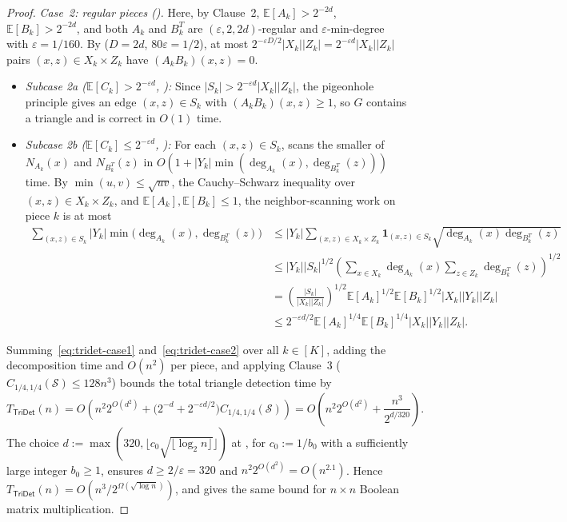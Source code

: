 \documentclass[11pt]{article}
\theoremstyle{definition}
\renewcommand{\label}[1]{}%
\newcommand{\E}{\mathbb{E}}
\newcommand{\One}{\mathbf{1}}
\newcommand{\abs}[1]{\left\lvert #1 \right\rvert}
\newcommand{\dens}[1]{\E[#1]}
\newcommand{\pot}{C_{1/4,1/4}}
\begin{document}
\begin{proof}
\emph{Case~2: regular pieces ().} Here, by Clause~2, $\dens{A_k} > 2^{-2d}$, $\dens{B_k} > 2^{-2d}$, and both $A_k$ and $B_k^T$ are $(\varepsilon, 2, 2d)$-regular and $\varepsilon$-min-degree with $\varepsilon = 1/160$. By  ($D = 2d$, $80\varepsilon = 1/2$), at most $2^{-\varepsilon D / 2}\abs{X_k}\abs{Z_k} = 2^{-\varepsilon d}\abs{X_k}\abs{Z_k}$ pairs $(x, z) \in X_k \times Z_k$ have $(A_k B_k)(x, z) = 0$.
\begin{itemize}[leftmargin=*]
    \item \emph{Subcase 2a ($\dens{C_k} > 2^{-\varepsilon d}$, ):} Since $\abs{S_k} > 2^{-\varepsilon d}\abs{X_k}\abs{Z_k}$, the pigeonhole principle gives an edge $(x, z) \in S_k$ with $(A_k B_k)(x, z) \ge 1$, so $G$ contains a triangle and  is correct in $O(1)$ time.
    \item \emph{Subcase 2b ($\dens{C_k} \le 2^{-\varepsilon d}$, ):} For each $(x, z) \in S_k$,  scans the smaller of $N_{A_k}(x)$ and $N_{B_k^T}(z)$ in $O(1 + \abs{Y_k}\min(\deg_{A_k}(x), \deg_{B_k^T}(z)))$ time. By $\min(u, v) \le \sqrt{u v}$, the Cauchy--Schwarz inequality over $(x, z) \in X_k \times Z_k$, and $\dens{A_k}, \dens{B_k} \le 1$, the neighbor-scanning work on piece $k$ is at most
    \begin{align}
        \sum_{(x, z) \in S_k} \abs{Y_k}\min\!\big(\deg_{A_k}(x), \deg_{B_k^T}(z)\big)
        &\le \abs{Y_k} \sum_{(x, z) \in X_k \times Z_k} \One_{(x, z) \in S_k} \sqrt{\deg_{A_k}(x)\deg_{B_k^T}(z)} \nonumber\\
        &\le \abs{Y_k} \abs{S_k}^{1/2} \left(\sum_{x \in X_k}\deg_{A_k}(x) \sum_{z \in Z_k}\deg_{B_k^T}(z)\right)^{1/2} \nonumber\\
        &= \left(\frac{\abs{S_k}}{\abs{X_k}\abs{Z_k}}\right)^{1/2} \dens{A_k}^{1/2}\dens{B_k}^{1/2}\abs{X_k}\abs{Y_k}\abs{Z_k} \nonumber\\
        &\le 2^{-\varepsilon d / 2}\dens{A_k}^{1/4}\dens{B_k}^{1/4}\abs{X_k}\abs{Y_k}\abs{Z_k}. \label{eq:tridet-case2}
    \end{align}
\end{itemize}

Summing~\eqref{eq:tridet-case1} and~\eqref{eq:tridet-case2} over all $k \in [K]$, adding the decomposition time and $O(n^2)$ per piece, and applying Clause~3 ($\pot(\mathcal{S}) \le 128 n^3$) bounds the total triangle detection time by
\[
    T_{\mathsf{TriDet}}(n) = O\!\left(n^2 2^{O(d^2)} + \big(2^{-d} + 2^{-\varepsilon d / 2}\big) \pot(\mathcal{S})\right) = O\!\left(n^2 2^{O(d^2)} + \frac{n^3}{2^{d / 320}}\right).
\]
The choice $d := \max(320, \lfloor c_0 \sqrt{\lfloor \log_2 n \rfloor} \rfloor)$ at , for $c_0 := 1/b_0$ with a sufficiently large integer $b_0 \ge 1$, ensures $d \ge 2/\varepsilon = 320$ and $n^2 2^{O(d^2)} = O(n^{2.1})$. Hence $T_{\mathsf{TriDet}}(n) = O\!\left(n^3 / 2^{\Omega(\sqrt{\log n})}\right)$, and  gives the same bound for $n \times n$ Boolean matrix multiplication.
\end{proof}
\end{document}
